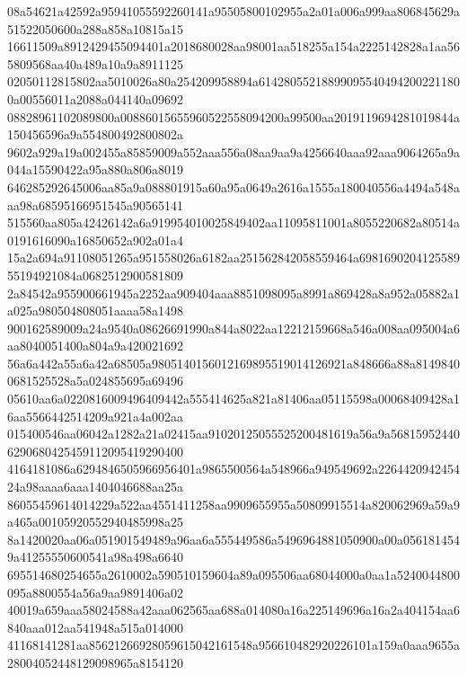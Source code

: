 \documentclass[10pt,letterpaper]{article}
\newenvironment{hexcertificate}{\par\begingroup\ttfamily\scriptsize\raggedright\setlength{\parskip}{0pt}\noindent}{\par\endgroup}
\begin{document}
\begin{hexcertificate}
08a54621a42592a95941055592260141a95505800102955a2a01a006a999aa806845629a51522050600a288a858a10815a15\\
16611509a8912429455094401a2018680028aa98001aa518255a154a2225142828a1aa565809568aa40a489a10a9a8911125\\
02050112815802aa5010026a80a254209958894a614280552188990955404942002211800a00556011a2088a044140a09692\\
08828961102089800a00886015655960522558094200a99500aa2019119694281019844a150456596a9a554800492800802a\\
9602a929a19a002455a85859009a552aaa556a08aa9aa9a4256640aaa92aaa9064265a9a044a15590422a95a880a806a8019\\
646285292645006aa85a9a088801915a60a95a0649a2616a1555a180040556a4494a548aaa98a68595166951545a90565141\\
515560aa805a42426142a6a919954010025849402aa11095811001a8055220682a80514a0191616090a16850652a902a01a4\\
15a2a694a91108051265a951558026a6182aa251562842058559464a698169020412558955194921084a0682512900581809\\
2a84542a955900661945a2252aa909404aaa8851098095a8991a869428a8a952a05882a1a025a980504808051aaaa58a1498\\
900162589009a24a9540a08626691990a844a8022aa12212159668a546a008aa095004a6aa8040051400a804a9a420021692\\
56a6a442a55a6a42a68505a9805140156012169895519014126921a848666a88a81498400681525528a5a024855695a69496\\
05610aa6a0220816009496409442a555414625a821a81406aa05115598a00068409428a16aa5566442514209a921a4a002aa\\
015400546aa06042a1282a21a02415aa91020125055525200481619a56a9a568159524406290680425459112095419290400\\
4164181086a6294846505966956401a9865500564a548966a949549692a226442094245424a98aaaa6aaa1404046688aa25a\\
86055459614014229a522aa4551411258aa9909655955a50809915514a820062969a59a9a465a00105920552940485998a25\\
8a1420020aa06a051901549489a96aa6a555449586a5496964881050900a00a0561814549a41255550600541a98a498a6640\\
695514680254655a2610002a590510159604a89a095506aa68044000a0aa1a5240044800095a8800554a56a9aa9891406a02\\
40019a659aaa58024588a42aaa062565aa688a014080a16a225149696a16a2a404154aa6840aaa012aa541948a515a014000\\
41168141281aa85621266928059615042161548a956610482920226101a159a0aaa9655a28004052448129098965a8154120\\

\end{hexcertificate}
\end{document}
